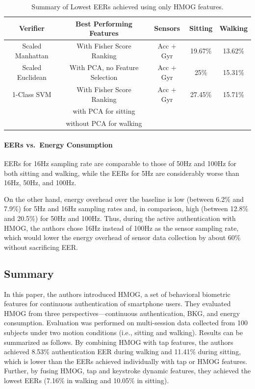 \documentclass{article}
\begin{document}
\begin{table}[!htbp]
  \caption{Summary of Lowest EERs achieved using only HMOG features.}%
  \centering
  \begin{tabular}{| c | c | c | c | c |} %
  \hline
  Verifier & Best Performing Features & Sensors & Sitting & Walking \\ \hline  %
  Scaled Manhattan & With Fisher Score Ranking & Acc + Gyr & 19.67\% & 13.62\%  \\ \hline %
  Scaled Euclidean & With PCA, no Feature Selection	& Acc + Gyr	& 25\% & 15.31\% \\ \hline %
  1-Class SVM & With Fisher Score Ranking & Acc + Gyr	& 27.45\% & 15.71\% \\ %
    & with PCA for sitting & 	&  & \\ %
    & without PCA for walking & 	&  & \\ \hline %
  \end{tabular}
  \label{tab:individualperformance}
  \vspace{12pt}
\end{table}

\paragraph{EERs vs.~Energy Consumption} 
EERs for 16Hz 
sampling rate are comparable to those of 50Hz and 100Hz for both sitting and walking, while the EERs for 5Hz are 
considerably worse than 16Hz, 50Hz, and 100Hz. 

On the other hand, energy overhead over the baseline is low (between 
6.2\% and 7.9\%) for 5Hz and
16Hz sampling rates and, in comparison, high (between 12.8\% and 20.5\%) for 50Hz 
and 100Hz. 
%
Thus, during the active authentication with HMOG, the authors chose 16Hz instead of 
100Hz as the sensor sampling rate, which would lower the energy overhead of 
sensor data collection by about 60\% without sacrificing EER. 

\subsection{Summary}

In this paper, the authors introduced HMOG, a set of behavioral biometric features for continuous 
authentication of smartphone users.  They evaluated HMOG from three perspectives---continuous authentication, BKG, and energy consumption. Evaluation was performed on multi-session data collected from 100 subjects under two motion conditions (i.e., sitting and walking). Results can be summarized as follows. By combining HMOG with tap features, the authors achieved 8.53\% authentication EER during walking and 11.41\% during sitting, which is lower than the EERs achieved individually with tap or HMOG features. Further, by fusing HMOG, tap and keystroke dynamic features, they achieved the lowest EERs (7.16\% in walking and 10.05\% in sitting).
\end{document}
